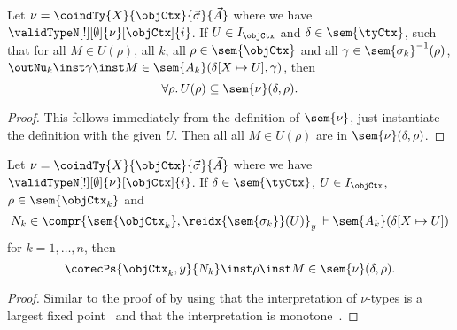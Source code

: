 \documentclass[preprint]{sigplanconf}
\begin{document}
\begin{lemma}
  \label{lem:coind-is-largest-fp}
  Let $\nu = \coindTy{X}{\objCtx}{\vec{\sigma}}{\vec{A}}$ where we have
  $\validTypeN[!][\emptyset]{\nu}[\objCtx]{i}$.
  If $U \in I_{\objCtx}$ and $\delta \in \sem{\tyCtx}$, such that for all
  $M \in U(\rho)$, all $k$,
  all $\rho \in \sem{\objCtx}$ and all
  $\gamma \in \sem{\sigma_k}^{-1}(\rho)$,
  $\outNu_k \inst \gamma \inst M \in \sem{A_k}(\delta[X \mapsto U], \gamma)$,
  then
  \begin{equation*}
    \forall \rho. \, U(\rho) \subseteq \sem{\nu}(\delta, \rho).
  \end{equation*}
\end{lemma}
\begin{proof}
  This follows immediately from the definition of $\sem{\nu}$, just instantiate
  the definition with the given $U$.
  Then all all $M \in U(\rho)$ are in $\sem{\nu}(\delta, \rho)$.
\end{proof}

\begin{lemma}
  \label{lem:corec-closure}
  Let $\nu = \coindTy{X}{\objCtx}{\vec{\sigma}}{\vec{A}}$ where we have
  $\validTypeN[!][\emptyset]{\nu}[\objCtx]{i}$.
  If $\delta \in \sem{\tyCtx}$, $U \in I_{\objCtx}$,
  $\rho \in \sem{\objCtx_k}$ and
  \begin{equation*}
     N_k \in
     \compr{\sem{\objCtx_k}, \reidx{\sem{\sigma_k}}(U)}_y
     \Vdash \sem{A_k}(\delta[X \mapsto U])
  \end{equation*}
  for $k = 1, \dotsc, n$,
  then
  \begin{equation*}
    \corecPs{\objCtx_k, y}{N_k} \inst \rho \inst M
    \in \sem{\nu}(\delta, \rho).
  \end{equation*}
\end{lemma}
\begin{proof}
  Similar to the proof of  by using that
  the interpretation of $\nu$-types is a largest fixed
  point~ and that the interpretation is
  monotone~.
\end{proof}
\end{document}
